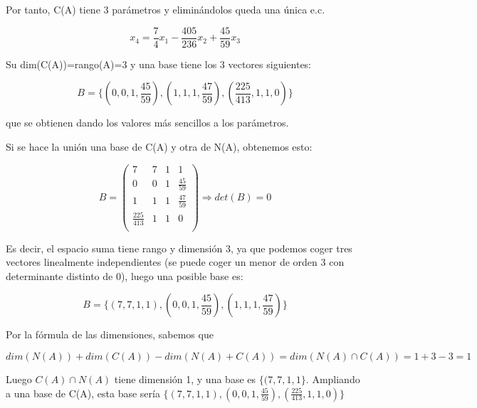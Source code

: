 \documentclass[11pt, a4paper]{article}
\newif\IfInSansMode
\theoremstyle{theorem-style}
\theoremstyle{definition-style}
\theoremstyle{remark-style}
\theoremstyle{example-style}
\begin{document}
Por tanto, C(A) tiene 3 parámetros y eliminándolos queda una única e.c.

$$x_4 = \frac{7}{4}x_1 - \frac{405}{236}x_2 + \frac{45}{59}x_3$$

Su dim(C(A))=rango(A)=3 y una base tiene los 3 vectores siguientes:

$$B = \{(0,0,1,\frac{45}{59}), (1,1,1,\frac{47}{59}), (\frac{225}{413},1,1,0)\}$$

que se obtienen dando los valores más sencillos a los parámetros.

Si se hace la unión una base de C(A) y otra de N(A), obtenemos esto:

$$B = \begin{pmatrix}
7 & 7 & 1 & 1 \\
0 & 0 & 1 & \frac{45}{59} \\
1 & 1 & 1 & \frac{47}{59} \\
\frac{225}{413} & 1 & 1 & 0 \\
\end{pmatrix} \Longrightarrow det(B) = 0$$

Es decir, el espacio suma tiene rango y dimensión 3, ya que podemos coger tres vectores linealmente independientes (se puede coger un menor de orden 3 con determinante distinto de 0), luego una posible base es:

$$B = \{(7,7,1,1),(0,0,1,\frac{45}{59}), (1,1,1,\frac{47}{59})\}$$

Por la fórmula de las dimensiones, sabemos que

$$dim(N(A)) + dim(C(A)) - dim(N(A)+C(A)) = dim(N(A) \cap C(A)) = 1+3-3 = 1$$

Luego $C(A) \cap N(A)$ tiene dimensión 1, y una base es $\{(7,7,1,1\}$. Ampliando a una base de C(A), esta base sería $\{(7,7,1,1),(0,0,1,\frac{45}{59}),(\frac{225}{413},1,1,0)\}$


\end{document}
